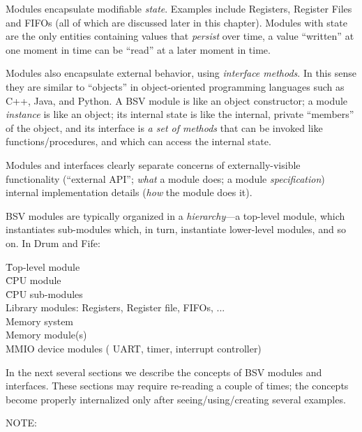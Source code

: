 Modules encapsulate modifiable \emph{state}.  Examples include
Registers, Register Files and FIFOs (all of which are discussed later
in this chapter).  Modules with state are the only entities containing
values that \emph{persist} over time, {\ie} a value ``written'' at one
moment in time can be ``read'' at a later moment in time.


Modules also encapsulate external behavior, using \emph{interface
methods}.  In this sense they are similar to ``objects'' in
object-oriented programming languages such as C++, Java, and Python.
A BSV module is like an object constructor; a module \emph{instance}
is like an object; its internal state is like the internal, private
``members'' of the object, and its interface is \emph{a set of
methods} that can be invoked like functions/procedures, and which can
access the internal state.

Modules and interfaces clearly separate concerns of externally-visible
functionality (``external API''; \emph{what} a module does; a module
\emph{specification}) {\vs} internal implementation details
(\emph{how} the module does it).

BSV modules are typically organized in a \emph{hierarchy}---a top-level module, which instantiates sub-modules which, in turn, instantiate lower-level modules, and so on.
In Drum and Fife:
\begin{tabbing}
\hmm \= Top-level module \\
     \> \hmm \= CPU module \\
     \>      \> \hmm \= CPU sub-modules \\
     \>      \>      \> \hmm Library modules: Registers, Register file, FIFOs, ... \\
     \>      \> Memory system \\
     \>      \>      \> Memory module(s) \\
     \>      \>      \> MMIO device modules ({\eg} UART, timer, interrupt controller)
\end{tabbing}

In the next several sections we describe the concepts of BSV modules
and interfaces.  These sections may require re-reading a couple of
times; the concepts become properly internalized only after
seeing/using/creating several examples.

\vspace{2ex}

NOTE:

